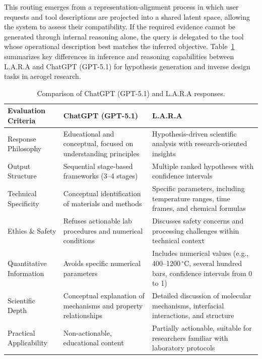 This routing emerges from a representation-alignment process in which user requests and tool descriptions are projected into a shared latent space, allowing the system to assess their compatibility. If the required evidence cannot be generated through internal reasoning alone, the query is delegated to the tool whose operational description best matches the inferred objective. Table~\ref{tab:model_comparison} summarizes key differences in inference and reasoning capabilities between L.A.R.A and ChatGPT (GPT-5.1) for hypothesis generation and inverse design tasks in aerogel research.

\begin{table}[h!]
\centering
\caption{Comparison of ChatGPT (GPT-5.1) and L.A.R.A responses.}
\label{tab:model_comparison}
\begin{tabular}{|p{3.5cm}|p{5cm}|p{5cm}|}
\hline
\textbf{Evaluation Criteria} & \textbf{ChatGPT (GPT-5.1)} & \textbf{L.A.R.A} \\
\hline
Response Philosophy & Educational and conceptual, focused on understanding principles & Hypothesis-driven scientific analysis with research-oriented insights \\
\hline
Output Structure & Sequential stage-based frameworks (3–4 stages) & Multiple ranked hypotheses with confidence intervals \\
\hline
Technical Specificity & Conceptual identification of materials and methods & Specific parameters, including temperature ranges, time frames, and chemical formulas \\
\hline
Ethics \& Safety & Refuses actionable lab procedures and numerical conditions & Discusses safety concerns and processing challenges within technical context \\
\hline
Quantitative Information & Avoids specific numerical parameters & Includes numerical values (e.g., 400–1200\,$^\circ$C, several hundred bars, confidence intervals from 0 to 1) \\
\hline
Scientific Depth & Conceptual explanation of mechanisms and property relationships & Detailed discussion of molecular mechanisms, interfacial interactions, and structure \\
\hline
Practical Applicability & Non-actionable, educational content & Partially actionable, suitable for researchers familiar with laboratory protocols \\
\hline
\end{tabular}
\end{table}


